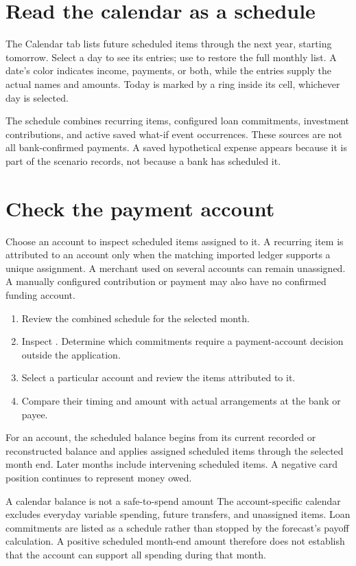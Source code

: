 \section{Read the calendar as a schedule}
The Calendar tab lists future scheduled items through the next year, starting tomorrow. Select a day to see its entries; use  to restore the full monthly list. A date's color indicates income, payments, or both, while the entries supply the actual names and amounts. Today is marked by a ring inside its cell, whichever day is selected.

The schedule combines recurring items, configured loan commitments, investment contributions, and active saved what-if event occurrences. These sources are not all bank-confirmed payments. A saved hypothetical expense appears because it is part of the scenario records, not because a bank has scheduled it.

\section{Check the payment account}
Choose an account to inspect scheduled items assigned to it. A recurring item is attributed to an account only when the matching imported ledger supports a unique assignment. A merchant used on several accounts can remain unassigned. A manually configured contribution or payment may also have no confirmed funding account.

\begin{enumerate}
\item Review the combined schedule for the selected month.
\item Inspect . Determine which commitments require a payment-account decision outside the application.
\item Select a particular account and review the items attributed to it.
\item Compare their timing and amount with actual arrangements at the bank or payee.
\end{enumerate}

For an account, the scheduled balance begins from its current recorded or reconstructed balance and applies assigned scheduled items through the selected month end. Later months include intervening scheduled items. A negative card position continues to represent money owed.

\begin{notebox}{A calendar balance is not a safe-to-spend amount}
The account-specific calendar excludes everyday variable spending, future transfers, and unassigned items. Loan commitments are listed as a schedule rather than stopped by the forecast's payoff calculation. A positive scheduled month-end amount therefore does not establish that the account can support all spending during that month.
\end{notebox}

